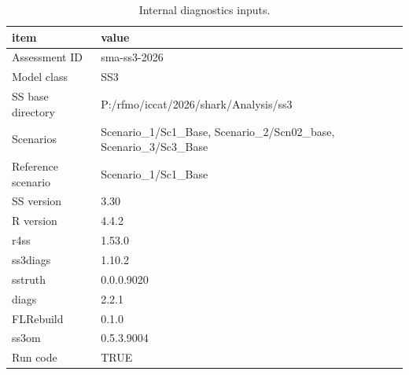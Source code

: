 \begin{table}

\caption{\label{tab:internal-inputs}Internal diagnostics inputs.}
\centering
\begin{tabular}[t]{ll}
\toprule
item & value\\
\midrule
Assessment ID & sma-ss3-2026\\
Model class & SS3\\
SS base directory & P:/rfmo/iccat/2026/shark/Analysis/ss3\\
Scenarios & Scenario\_1/Sc1\_Base, Scenario\_2/Scn02\_base, Scenario\_3/Sc3\_Base\\
Reference scenario & Scenario\_1/Sc1\_Base\\
\addlinespace
SS version & 3.30\\
R version & 4.4.2\\
r4ss & 1.53.0\\
ss3diags & 1.10.2\\
sstruth & 0.0.0.9020\\
\addlinespace
diags & 2.2.1\\
FLRebuild & 0.1.0\\
ss3om & 0.5.3.9004\\
Run code & TRUE\\
\bottomrule
\end{tabular}
\end{table}

